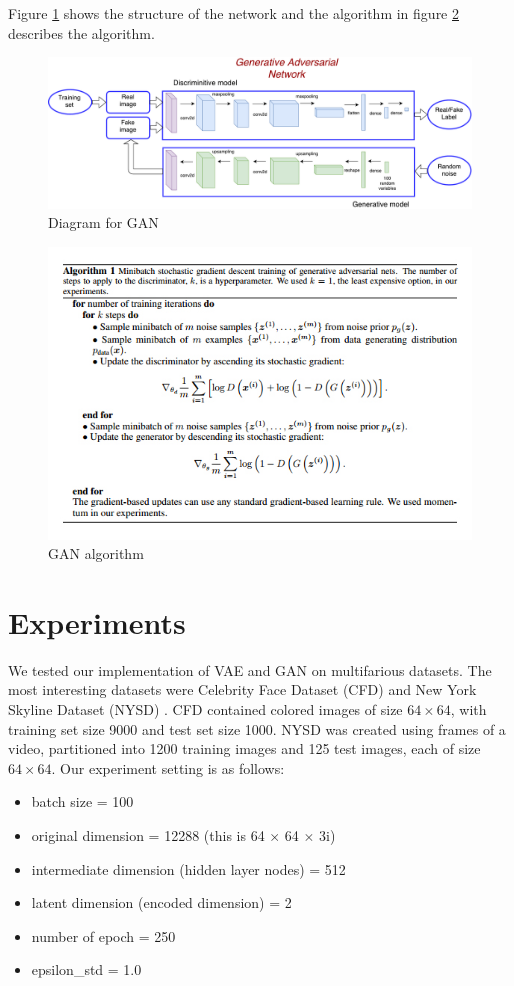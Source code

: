 \documentclass{article} %
\begin{document}
Figure \ref{diag} shows the structure of the network and the algorithm in figure \ref{algo} describes the algorithm.
\begin{figure}[H]
\centering
\includegraphics[width=15cm]{GAN-diagram.pdf}
\caption{Diagram for GAN}
\label{diag}
\end{figure}
\begin{figure}[h]
    \centering
    \includegraphics[width=12cm]{algo.jpg}
    \caption{GAN algorithm}
    \label{algo}
\end{figure}

\section{Experiments}
We tested our implementation of VAE and GAN on multifarious datasets. The most interesting datasets were Celebrity Face Dataset (CFD) \cite{celeb} and New York Skyline Dataset (NYSD) \cite{skyline}. CFD contained colored images of size $64 \times 64$, with training set size 9000 and test set size 1000. NYSD was created using frames of a video, partitioned into 1200 training images and 125 test images, each of size $64 \times 64$.  Our experiment setting is as follows:
\begin{itemize}
    \item    batch size = 100
    \item     original dimension = 12288 (this is 64 $\times$  64 $\times$  3i)
    \item    intermediate dimension (hidden layer nodes) = 512
    \item    latent dimension (encoded dimension) = 2
    \item    number of epoch = 250
    \item    epsilon\_std = 1.0
\end{itemize}
\end{document}

